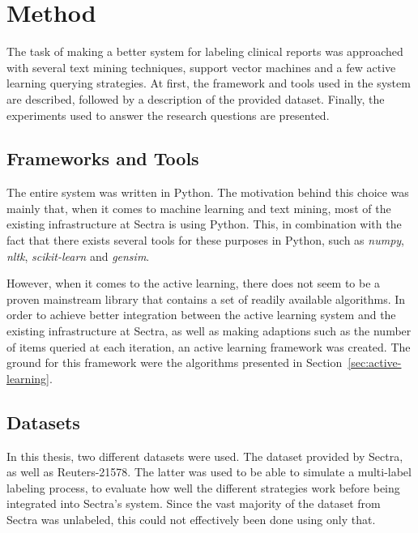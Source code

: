 \chapter{Method}
\label{cha:method}

%

The task of making a better system for labeling clinical reports was approached with several text mining techniques, support vector machines and a few active learning querying strategies.
At first, the framework and tools used in the system are described, followed by a description of the provided dataset.
Finally, the experiments used to answer the research questions are presented.

\section{Frameworks and Tools}
The entire system was written in Python.
The motivation behind this choice was mainly that, when it comes to machine learning and text mining, most of the existing infrastructure at Sectra is using Python.
This, in combination with the fact that there exists several tools for these purposes in Python, such as \textit{numpy}, \textit{nltk}, \textit{scikit-learn} and \textit{gensim}. %

However, when it comes to the active learning, there does not seem to be a proven mainstream library that contains a set of readily available algorithms.
In order to achieve better integration between the active learning system and the existing infrastructure at Sectra, as well as making adaptions such as the number of items queried at each iteration, an active learning framework was created.
The ground for this framework were the algorithms presented in Section~\ref{sec:active-learning}.

\section{Datasets}
In this thesis, two different datasets were used.
The dataset provided by Sectra, as well as Reuters-21578.
The latter was used to be able to simulate a multi-label labeling process, to evaluate how well the different strategies work before being integrated into Sectra's system.
Since the vast majority of the dataset from Sectra was unlabeled, this could not effectively been done using only that.

